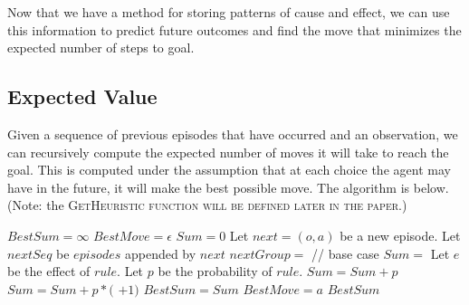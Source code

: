 \documentclass[letterpaper]{article} %
\begin{document}


Now that we have a method for storing patterns of cause and effect, we
can use this information to predict future outcomes and find the
move that minimizes the expected number of steps to goal.

\subsection{Expected Value}

Given a sequence of previous episodes that have occurred and an
observation, we can recursively compute the expected number of moves
it will take to reach the goal. This is computed under the assumption
that at each choice the agent may have in the future, it will make the
best possible move. The algorithm is below.  (Note:
the \scshape GetHeuristic \normalfont function will be defined later in the paper.)


\algrenewcommand\algorithmicindent{1.25em}
\begin{algorithmic}[1]
		\State $BestSum = \infty$
		\State $BestMove = \epsilon$
			\State $Sum = 0$
			\State Let $next = (o, a)$ be a new episode.
			\State Let $nextSeq$ be $episodes$ appended by $next$
			\State $nextGroup =$  %
			  \hspace{35pt} // base case
				\State $Sum = $  \label{line:heuristic}
			\EndIf
				\State Let $e$ be the effect of $rule$.
				\State Let $p$ be the probability of $rule$.
					\State $Sum = Sum + p$
				\Else
					\State $Sum = Sum + p*($ $ + 1)$
				\EndIf
			\EndFor
				\State $BestSum = Sum$
				\State $BestMove = a$
			\EndIf
		\EndFor
	\State \Return $BestSum$
	\EndFunction
\end{algorithmic}
\end{document}
